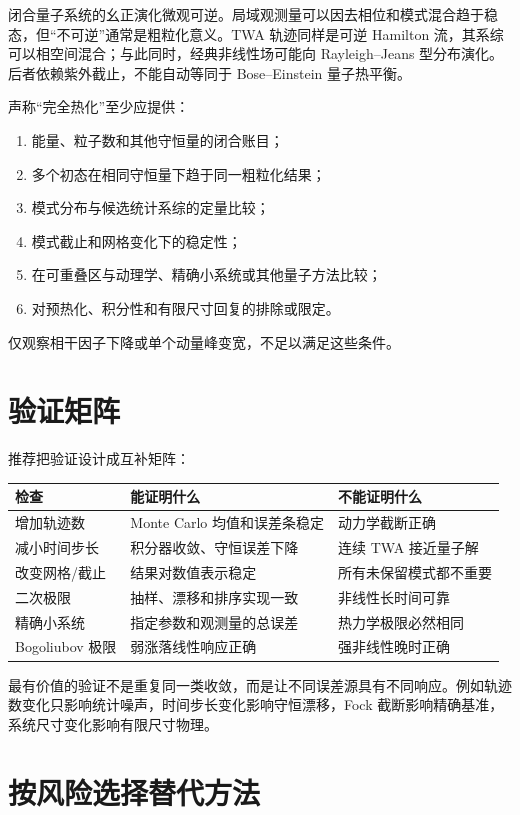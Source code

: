 闭合量子系统的幺正演化微观可逆。局域观测量可以因去相位和模式混合趋于稳态，但“不可逆”通常是粗粒化意义。TWA 轨迹同样是可逆 Hamilton 流，其系综可以相空间混合；与此同时，经典非线性场可能向 Rayleigh--Jeans 型分布演化。后者依赖紫外截止，不能自动等同于 Bose--Einstein 量子热平衡。

声称“完全热化”至少应提供：
\begin{enumerate}
  \item 能量、粒子数和其他守恒量的闭合账目；
  \item 多个初态在相同守恒量下趋于同一粗粒化结果；
  \item 模式分布与候选统计系综的定量比较；
  \item 模式截止和网格变化下的稳定性；
  \item 在可重叠区与动理学、精确小系统或其他量子方法比较；
  \item 对预热化、积分性和有限尺寸回复的排除或限定。
\end{enumerate}
仅观察相干因子下降或单个动量峰变宽，不足以满足这些条件。

\section{验证矩阵}

推荐把验证设计成互补矩阵：
\begin{center}
\begin{tabularx}{\textwidth}{p{}X X}
\toprule
检查 & 能证明什么 & 不能证明什么 \\
\midrule
增加轨迹数 & Monte Carlo 均值和误差条稳定 & 动力学截断正确 \\
减小时间步长 & 积分器收敛、守恒误差下降 & 连续 TWA 接近量子解 \\
改变网格/截止 & 结果对数值表示稳定 & 所有未保留模式都不重要 \\
二次极限 & 抽样、漂移和排序实现一致 & 非线性长时间可靠 \\
精确小系统 & 指定参数和观测量的总误差 & 热力学极限必然相同 \\
Bogoliubov 极限 & 弱涨落线性响应正确 & 强非线性晚时正确 \\
\bottomrule
\end{tabularx}
\end{center}

最有价值的验证不是重复同一类收敛，而是让不同误差源具有不同响应。例如轨迹数变化只影响统计噪声，时间步长变化影响守恒漂移，Fock 截断影响精确基准，系统尺寸变化影响有限尺寸物理。

\section{按风险选择替代方法}

